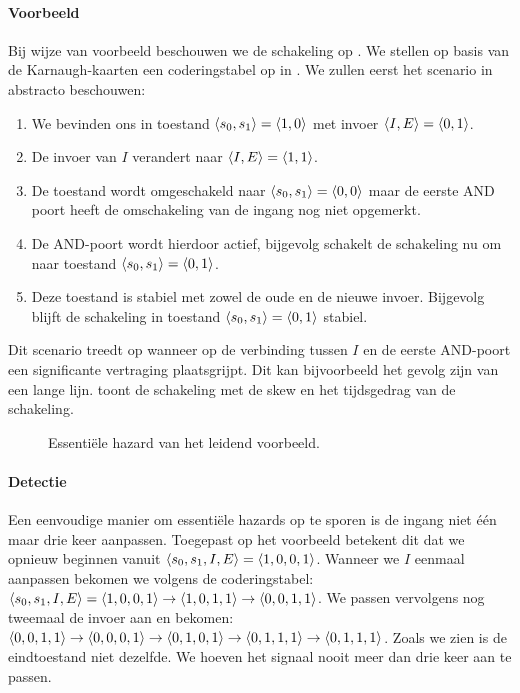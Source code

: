 \paragraph{Voorbeeld}
Bij wijze van voorbeeld beschouwen we de schakeling op . We stellen op basis van de Karnaugh-kaarten een coderingstabel op in .
We zullen eerst het scenario in abstracto beschouwen:
\begin{enumerate}
 \item We bevinden ons in toestand $\left\langle s_0,s_1 \right\rangle=\left\langle 1,0 \right\rangle$ met invoer $\left\langle I,E \right\rangle=\left\langle 0,1 \right\rangle$.
 \item De invoer van $I$ verandert naar $\left\langle I,E \right\rangle=\left\langle 1,1 \right\rangle$.
 \item De toestand wordt omgeschakeld naar $\left\langle s_0,s_1 \right\rangle=\left\langle 0,0 \right\rangle$ maar de eerste AND poort heeft de omschakeling van de ingang nog niet opgemerkt.
 \item De AND-poort wordt hierdoor actief, bijgevolg schakelt de schakeling nu om naar toestand $\left\langle s_0,s_1 \right\rangle=\left\langle 0,1 \right\rangle$.
 \item Deze toestand is stabiel met zowel de oude en de nieuwe invoer. Bijgevolg blijft de schakeling in toestand $\left\langle s_0,s_1 \right\rangle=\left\langle 0,1 \right\rangle$ stabiel.
\end{enumerate}
Dit scenario treedt op wanneer op de verbinding tussen $I$ en de eerste AND-poort een significante vertraging plaatsgrijpt. Dit kan bijvoorbeeld het gevolg zijn van een lange lijn.  toont de schakeling met de skew en  het tijdsgedrag van de schakeling.
\begin{figure}[hbt]
\centering
{}
\caption{Essenti\"ele hazard van het leidend voorbeeld.}
\end{figure}
\paragraph{Detectie}
Een eenvoudige manier om essenti\"ele hazards op te sporen is de ingang niet \'e\'en maar drie keer aanpassen. Toegepast op het voorbeeld betekent dit dat we opnieuw beginnen vanuit $\left\langle s_0,s_1,I,E \right\rangle=\left\langle 1,0,0,1 \right\rangle$. Wanneer we $I$ eenmaal aanpassen bekomen we volgens de coderingstabel: $\left\langle s_0,s_1,I,E \right\rangle=\left\langle 1,0,0,1 \right\rangle\rightarrow\left\langle 1,0,1,1 \right\rangle\rightarrow\left\langle 0,0,1,1 \right\rangle$. We passen vervolgens nog tweemaal de invoer aan en bekomen: $\left\langle 0,0,1,1 \right\rangle\rightarrow\left\langle 0,0,0,1 \right\rangle\rightarrow\left\langle 0,1,0,1 \right\rangle\rightarrow\left\langle 0,1,1,1 \right\rangle\rightarrow\left\langle 0,1,1,1 \right\rangle$. Zoals we zien is de eindtoestand niet dezelfde. We hoeven het signaal nooit meer dan drie keer aan te passen.
